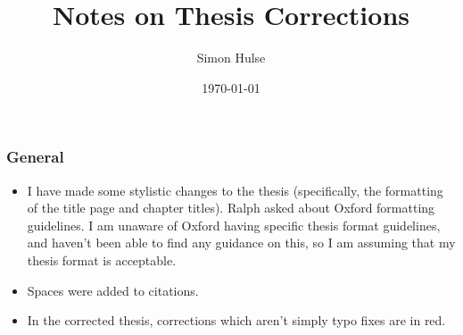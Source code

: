 \documentclass[12pt]{article}
\author{Simon Hulse}
\title{Notes on Thesis Corrections}
\date{\today}
\begin{document}
    \maketitle

    \subsubsection*{General}
    \begin{itemize}
        \item I have made some stylistic changes to the thesis (specifically, the
            formatting of the title page and chapter titles). Ralph asked about Oxford
            formatting guidelines. I am unaware of Oxford having specific thesis format
            guidelines, and haven't been able to find any guidance on this, so I am
            assuming that my thesis format is acceptable.
        \item Spaces were added to citations.
        \item In the corrected thesis, corrections which aren't simply typo fixes are in red.
    \end{itemize}
\end{document}
